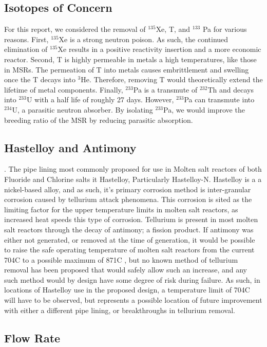 \documentclass{anstrans}
\begin{document}
\subsection{Isotopes of Concern}
For this report, we considered the removal of $^{135}$Xe, T, and $^{133}$ Pa for various reasons. First, $^{135}$Xe is a strong neutron poison. As such, the continued elimination of $^{135}$Xe results in a positive reactivity insertion and a more economic reactor. Second, T is highly permeable in metals a high temperatures, like those in MSRs. The permeation of T into metals causes embrittlement and swelling once the T decays into $^3$He. Therefore, removing T would theoretically extend the lifetime of metal components. Finally, $^{233}$Pa is a transmute of $^{232}$Th and decays into $^{233}$U with a half life of roughly 27 days. However, $^{233}$Pa can transmute into $^{234}$U, a parasitic neutron absorber. By isolating $^{233}$Pa, we would improve the breeding ratio of the MSR by reducing parasitic absorption.

\subsection{Hastelloy and Antimony}. The pipe lining most commonly proposed for use in Molten salt reactors of both Fluoride and Chlorine salts it Hastelloy, Particularly Hastelloy-N. Hastelloy is a a nickel-based alloy, and as such, it's primary corrosion method is inter-granular corrosion caused by tellurium attack phenomena. This corrosion is sited as the limiting factor for the upper temperature limits in molten salt reactors, as increased heat speeds this type of corrosion. Tellurium is present in most molten salt reactors through the decay of antimony; a fission product. If antimony was either not generated, or removed at the time of generation, it would be possible to raise the safe operating temperature of molten salt reactors from the current 704C to a possible maximum of 871C \cite{NRCHastelloy}, but no known method of tellurium removal has been proposed that would safely allow such an increase, and any such method would by design have some degree of risk during failure. As such, in locations of Hastelloy use in the proposed design, a temperature limit of 704C will have to be observed, but represents a possible location of future improvement with either a different pipe lining, or breakthroughs in tellurium removal.
\subsection{Flow Rate}
\end{document}
